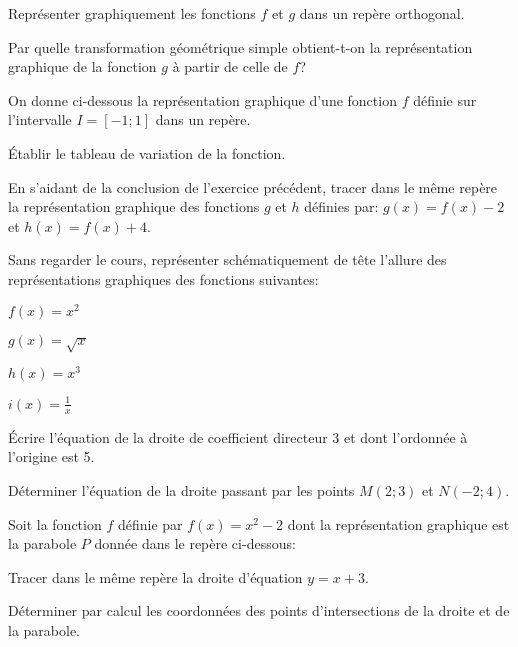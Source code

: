 \documentclass[a4paper,12pt]{scrartcl}
\begin{document}
\question{}
Représenter graphiquement les fonctions $f$ et $g$ dans un repère orthogonal. 

\begin{center}
\end{center}



\question{}
Par quelle transformation géométrique simple obtient-t-on la représentation graphique de la fonction $g$ à partir de celle de $f$?

On donne  ci-dessous la représentation graphique d'une fonction $f$ définie sur l'intervalle $I = [-1 ;1]$ dans un repère.

\begin{center}
\end{center}

\question{}
Établir le tableau de variation de la fonction. 

\question{}
En s'aidant de la conclusion de l'exercice précédent, tracer dans le même repère la représentation graphique des fonctions $g$ et $h$ définies par: $g(x) = f(x) - 2$ et $h(x) = f(x) + 4$.

Sans regarder le cours, représenter  schématiquement  de tête l'allure des représentations graphiques des fonctions suivantes:

\question{}
$f(x) = x^2$

\question{}
$g(x) = \sqrt{x}$

\question{}
$h(x) = x^3$

\question{}
$i(x) = \frac{1}{x}$

\exo{}
Écrire l'équation de la droite de coefficient directeur 3 et dont l'ordonnée à l'origine est 5.

\exo{}
Déterminer l'équation de la droite passant par les points $M(2 ;3)$ et $N(-2 ;4)$.

\exo{}
Soit la fonction $f$ définie par $f(x) = x^2 - 2$ dont la représentation graphique est la parabole $P$ donnée dans le repère ci-dessous:

\begin{center}
\end{center}

\question{}
Tracer dans le même repère la droite d'équation $y = x + 3$.

\question{}
Déterminer par calcul les coordonnées des points d'intersections de la droite et de la parabole. 
\end{document}
